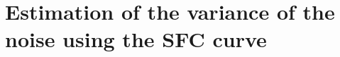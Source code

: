 \section{Estimation of the variance of the noise using the \gls{SFC} curve}
\label{sec:variance_SFC}

